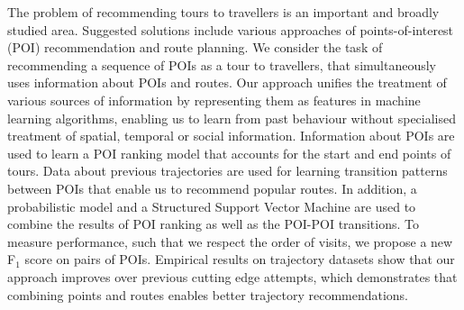 The problem of recommending tours to travellers is an important and broadly studied area.
Suggested solutions include various approaches of points-of-interest (POI) 
recommendation and route planning.
We consider the task of recommending a sequence of POIs as a tour
to travellers, that simultaneously uses information about POIs and routes.
Our approach unifies the treatment of various sources of information
by representing them as features in machine learning algorithms, enabling us to
learn from past behaviour without specialised treatment of
spatial, temporal or social information.
Information about POIs are used to learn a POI ranking model
that accounts for the start and end points of tours.
Data about previous trajectories are used for learning transition patterns between POIs that
enable us to recommend popular routes.
In addition, a probabilistic model and a Structured Support Vector Machine are used
to combine the results of POI ranking as well as the POI-POI transitions.
To measure performance, such that we respect the order of visits, we propose
a new F$_1$ score on pairs of POIs.
Empirical results on trajectory datasets show that our approach improves over 
previous cutting edge attempts, which demonstrates that
combining points and routes enables better trajectory recommendations.
